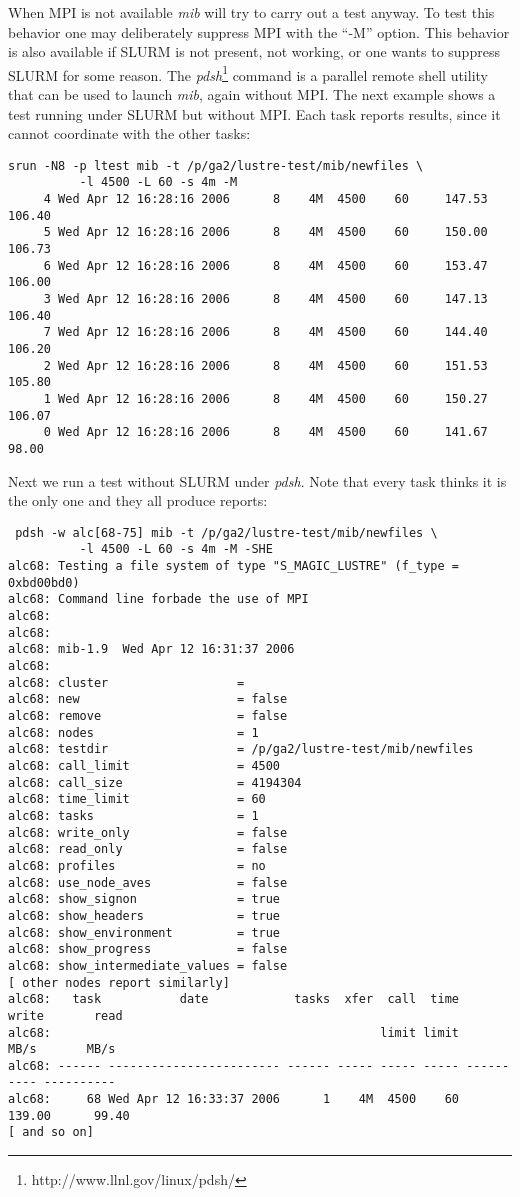 \documentclass{article}
\begin{document}
When MPI is not available {\em mib} will try to carry out a test
anyway.  To test this behavior one may deliberately suppress MPI with
the ``-M'' option.  This behavior is also available if SLURM is not
present, not working, or one wants to suppress SLURM for some reason.
The {\em pdsh}\footnote{http://www.llnl.gov/linux/pdsh/} command is a
parallel remote shell utility that can be used to launch {\em mib},
again without MPI.  The next example shows a test running under SLURM
but without MPI.  Each task reports results, since it cannot
coordinate with the other tasks:
{\small
  \begin{verbatim}
srun -N8 -p ltest mib -t /p/ga2/lustre-test/mib/newfiles \
          -l 4500 -L 60 -s 4m -M
     4 Wed Apr 12 16:28:16 2006      8    4M  4500    60     147.53     106.40
     5 Wed Apr 12 16:28:16 2006      8    4M  4500    60     150.00     106.73
     6 Wed Apr 12 16:28:16 2006      8    4M  4500    60     153.47     106.00
     3 Wed Apr 12 16:28:16 2006      8    4M  4500    60     147.13     106.40
     7 Wed Apr 12 16:28:16 2006      8    4M  4500    60     144.40     106.20
     2 Wed Apr 12 16:28:16 2006      8    4M  4500    60     151.53     105.80
     1 Wed Apr 12 16:28:16 2006      8    4M  4500    60     150.27     106.07
     0 Wed Apr 12 16:28:16 2006      8    4M  4500    60     141.67      98.00
  \end{verbatim}
}

\pagebreak
Next we run a test without SLURM under {\em pdsh}.  Note that every
task thinks it is the only one and they all produce reports:
{\small
  \begin{verbatim}
 pdsh -w alc[68-75] mib -t /p/ga2/lustre-test/mib/newfiles \
          -l 4500 -L 60 -s 4m -M -SHE
alc68: Testing a file system of type "S_MAGIC_LUSTRE" (f_type = 0xbd00bd0)
alc68: Command line forbade the use of MPI
alc68: 
alc68: 
alc68: mib-1.9  Wed Apr 12 16:31:37 2006
alc68: 
alc68: cluster                  = 
alc68: new                      = false
alc68: remove                   = false
alc68: nodes                    = 1
alc68: testdir                  = /p/ga2/lustre-test/mib/newfiles
alc68: call_limit               = 4500
alc68: call_size                = 4194304
alc68: time_limit               = 60
alc68: tasks                    = 1
alc68: write_only               = false
alc68: read_only                = false
alc68: profiles                 = no
alc68: use_node_aves            = false
alc68: show_signon              = true
alc68: show_headers             = true
alc68: show_environment         = true
alc68: show_progress            = false
alc68: show_intermediate_values = false
[ other nodes report similarly]
alc68:   task           date            tasks  xfer  call  time      write       read
alc68:                                              limit limit       MB/s       MB/s
alc68: ------ ------------------------ ------ ----- ----- ----- ---------- ----------
alc68:     68 Wed Apr 12 16:33:37 2006      1    4M  4500    60     139.00      99.40
[ and so on]
  \end{verbatim}
}
\end{document}
